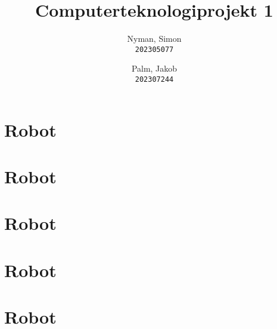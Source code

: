 \documentclass{article}
\author{
    Nyman, Simon\\
    \texttt{202305077}
    \and
    Palm, Jakob\\
    \texttt{202307244}
}
\begin{document}
    \pagestyle{plain}
    \title{Computerteknologiprojekt 1}
    \maketitle

    \section*{Robot}
    \section*{Robot}
    \section*{Robot}
    \section*{Robot}
    \section*{Robot}
\end{document}
